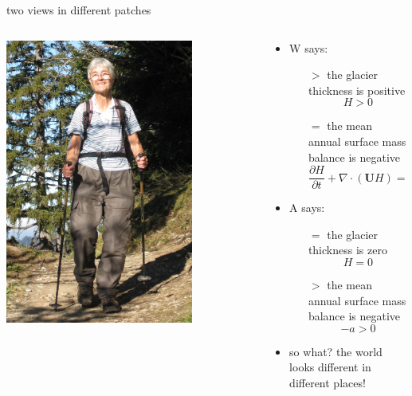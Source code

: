 \documentclass[10pt,hyperref,dvipsnames]{beamer}
\newcommand{\bU}{\mathbf{U}}
\newcommand{\Div}{\nabla\cdot}
\begin{document}
\begin{frame}{two views in different patches}
\begin{columns}
\begin{column}{0.25\textwidth}
\vspace{5mm}
\includegraphics[width=0.75\textwidth]{figs/Iken_front_crop.jpg}
\end{column}
\begin{column}{0.75\textwidth}
\begin{itemize}
\item W says:
    \begin{itemize}
    \item[$>$] the glacier thickness is positive
        $$H>0$$
    \item[$=$] the mean annual surface mass balance is negative
        $$\frac{\partial H}{\partial t} + \Div \left(\bU H\right) = a$$
    \end{itemize}
\item A says:
    \begin{itemize}
    \item[$=$] the glacier thickness is zero
        $$H=0$$
    \item[$>$] the mean annual surface mass balance is negative
        $$-a > 0$$
    \end{itemize}
\item<2> so what?  the world looks different in different places!
\end{itemize}
\end{column}
\end{columns}
\end{frame}
\end{document}
